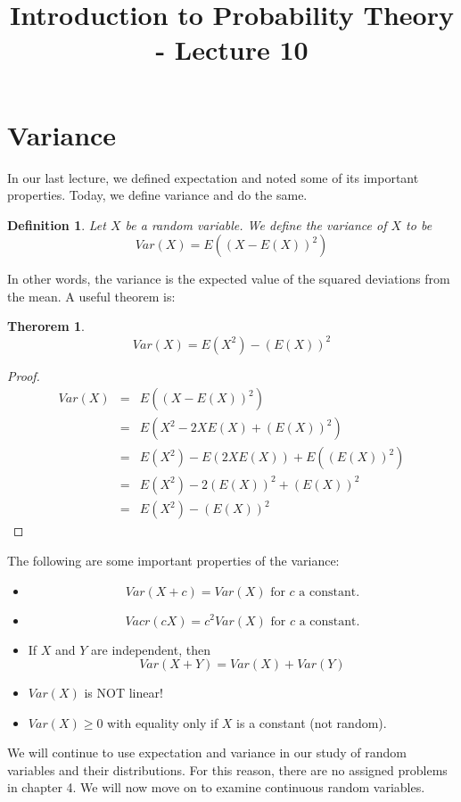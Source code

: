 \documentclass[12pt]{article} %
\date{}
\title{Introduction to Probability Theory - Lecture 10}
\newtheorem{defn}{Definition}
\newtheorem{thm}{Therorem}
\begin{document}
\maketitle
\section{Variance}
In our last lecture, we defined expectation and noted some of its important properties. Today, we define variance and do the same.
\begin{defn}
Let $X$  be a random variable. We define the \emph{variance} of $X$ to be
$$Var(X) = E\left(\left(X - E(X)\right)^2\right)$$
\end{defn}
In other words, the variance is the expected value of the squared deviations from the mean. A useful theorem is:
\begin{thm}
$$Var(X) = E(X^2)-\left(E(X)\right)^2$$
\end{thm}
\begin{proof}
\begin{eqnarray*}
Var(X) &=& E\left(\left(X - E(X)\right)^2\right)\\
&=& E\left(X^2 - 2XE(X)+\left(E(X)\right)^2\right)\\
&=& E(X^2) - E(2XE(X))+E(\left(E(X)\right)^2)\\
&=& E(X^2) - 2\left(E(X)\right)^2+\left(E(X)\right)^2\\
&=& E(X^2) - \left(E(X)\right)^2
\end{eqnarray*}
\end{proof}
The following are some important properties of the variance:
\begin{itemize}
\item $$Var(X+c) =Var(X) \textrm{ for } c \textrm{ a constant}.$$
\item $$Vacr(cX) = c^2 Var(X) \textrm{ for } c \textrm{ a constant}.$$
\item If $X$ and $Y$ are independent, then
$$Var(X+Y) = Var(X) + Var(Y)$$
\item $Var(X)$ is NOT linear!
\item $Var(X)\geq0$ with equality only if $X$ is a constant (not random). 
\end{itemize}
We will continue to use expectation and variance in our study of random variables and their distributions. For this reason, there are no assigned problems in chapter 4. We will now move on to examine continuous random variables.
\end{document}
